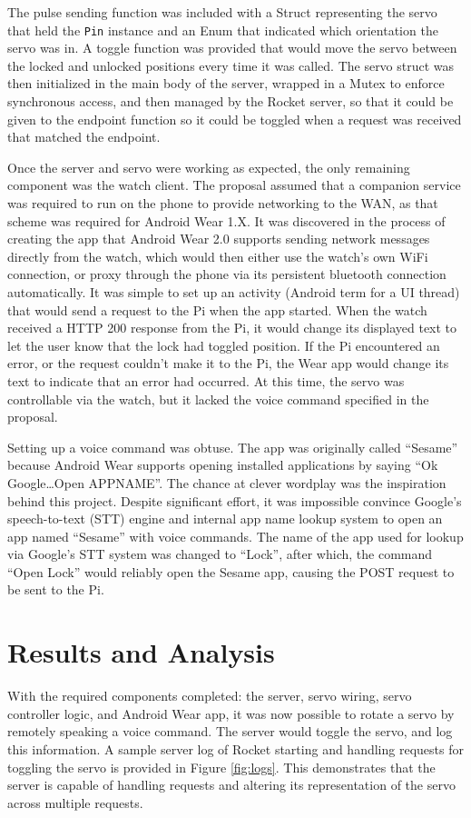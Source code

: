 \documentclass[a4paper]{article}
\begin{document}
The pulse sending function was included with a Struct representing the servo that held the \texttt{Pin} instance and an Enum that indicated which orientation the servo was in.
A toggle function was provided that would move the servo between the locked and unlocked positions every time it was called.
The servo struct was then initialized in the main body of the server, wrapped in a Mutex to enforce synchronous access, and then managed by the Rocket server, so that it could be given to the endpoint function so it could be toggled when a request was received that matched the endpoint.


Once the server and servo were working as expected, the only remaining component was the watch client.
The proposal assumed that a companion service was required to run on the phone to provide networking to the WAN, as that scheme was required for Android Wear 1.X.
It was discovered in the process of creating the app that Android Wear 2.0 supports sending network messages directly from the watch, which would then either use the watch's own WiFi connection, or proxy through the phone via its persistent bluetooth connection automatically.
It was simple to set up an activity (Android term for a UI thread) that would send a request to the Pi when the app started.
When the watch received a HTTP 200 response from the Pi, it would change its displayed text to let the user know that the lock had toggled position.
If the Pi encountered an error, or the request couldn't make it to the Pi, the Wear app would change its text to indicate that an error had occurred.
At this time, the servo was controllable via the watch, but it lacked the voice command specified in the proposal.

Setting up a voice command was obtuse.
The app was originally called ``Sesame'' because Android Wear supports opening installed applications by saying ``Ok Google\ldots Open APPNAME''.
The chance at clever wordplay was the inspiration behind this project.
Despite significant effort, it was impossible convince Google's speech-to-text (STT) engine and internal app name lookup system to open an app named ``Sesame'' with voice commands.
The name of the app used for lookup via Google's STT system was changed to ``Lock'', after which, the command ``Open Lock'' would reliably open the Sesame app, causing the POST request to be sent to the Pi.


\section{Results and Analysis}\label{sec:resultsAndAnalysis}
With the required components completed: the server, servo wiring, servo controller logic, and Android Wear app, it was now possible to rotate a servo by remotely speaking a voice command.
The server would toggle the servo, and log this information.
A sample server log of Rocket starting and handling requests for toggling the servo is provided in Figure \ref{fig:logs}.
This demonstrates that the server is capable of handling requests and altering its representation of the servo across multiple requests.
\end{document}
